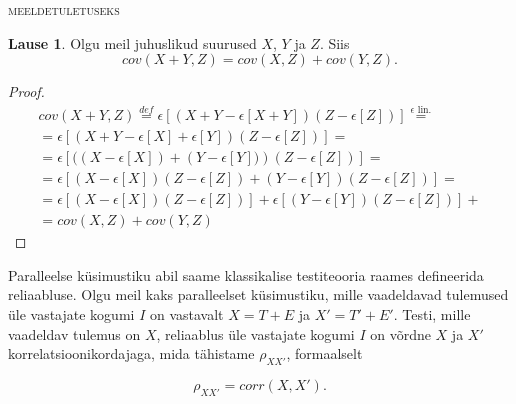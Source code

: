 \documentclass[a4paper,12pt]{article}
\newenvironment{meeldetuletus}{
	\begin{lrbox}{\thisOne}
		\begin{minipage}{0.95\textwidth} \vspace{0.25em} {\scriptsize \textsc{meeldetuletuseks}} \linebreak \vspace{-2em}
} 
{  
 \end{minipage}\end{lrbox}{
 		
 			\begin{mdframed}[tikzsetting={draw=black,dashed,line width=0.5pt, dash pattern = on 10pt off 3pt},%
 			linecolor=background_example,backgroundcolor=background_example,outerlinewidth=1pt]
 			\usebox{\thisOne}
 			\end{mdframed}
 		
 		
 	}
}
\numberwithin{equation}{section}
\theoremstyle{definition}
\newtheorem{summa_kovariatsioon}[equation]{Lause}
\begin{document}
\begin{meeldetuletus}
\begin{summa_kovariatsioon}
Olgu meil juhuslikud suurused $X$, $Y$ ja $Z$. Siis 
\begin{equation*}
cov(X+Y,Z) = cov(X,Z) + cov(Y,Z)  \text{.}
\end{equation*}
\end{summa_kovariatsioon}
\begin{proof}
\begin{gather*}
cov(X+Y,Z) \overset{def}{=} \epsilon \left[(X+Y - \epsilon \left[ X + Y \right])(Z - \epsilon \left[ Z \right] ) \right] \overset{\text{$\epsilon$ lin.}}{=} \\
= \epsilon \left[ (X+Y - \epsilon \left[ X \right] +  \epsilon \left[ Y \right])(Z - \epsilon \left[ Z \right]  ) \right] = \\
= \epsilon \left[ ( \left( X - \epsilon \left[ X \right] \right) +  \left( Y -\epsilon \left[ Y \right]) \right) \left(Z - \epsilon \left[ Z \right] \right)  \right] = \\
=\epsilon [  \left( X - \epsilon \left[ X \right] \right) \left( Z - \epsilon \left[ Z \right] \right) +  
 \left( Y -\epsilon \left[ Y \right] \right) \left(Z - \epsilon \left[ Z \right] \right)  ] = \\
 =\epsilon \left[  \left( X - \epsilon \left[ X \right] \right) \left( Z - \epsilon \left[ Z \right] \right) \right] +   
\epsilon \left[  \left( Y -\epsilon \left[ Y \right] \right) \left(Z - \epsilon \left[ Z \right] \right) \right] +   \\ 
 = cov(X,Z) + cov(Y,Z)
\end{gather*}
\end{proof}
\end{meeldetuletus}


Paralleelse küsimustiku abil saame klassikalise testiteooria raames defineerida reliaabluse. Olgu meil kaks paralleelset küsimustiku, mille vaadeldavad tulemused \"ule vastajate kogumi $I$ on vastavalt $X = T + E$ ja $X' = T' + E'$. Testi, mille vaadeldav tulemus on $X$,  reliaablus \"ule vastajate kogumi $I$ on võrdne $X$ ja $X'$ korrelatsioonikordajaga, mida tähistame $\rho_{XX'}$, formaalselt

\begin{equation*}
\rho_{XX'} = corr \left( X,X' \right) \text{.}
\end{equation*} 
\end{document}
